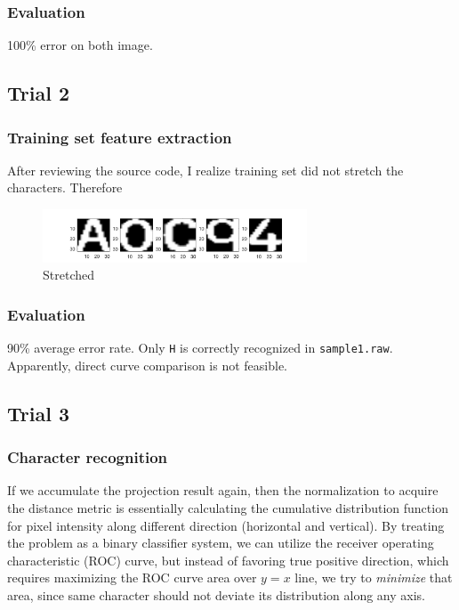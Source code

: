 \documentclass[12pt]{article}
\begin{document}
\subsubsection*{Evaluation}
100\% error on both image.

\subsection*{Trial 2}
\subsubsection*{Training set feature extraction}
After reviewing the source code, I realize training set did not stretch the characters. Therefore 
\begin{figure}[H]
    \centering
    \includegraphics[width=0.7\textwidth]{images/training_resized2_col1}
    \caption{Stretched}
\end{figure}

\subsubsection*{Evaluation}
90\% average error rate. Only {\tt H} is correctly recognized in {\tt sample1.raw}. Apparently, direct curve comparison is not feasible. 

\subsection*{Trial 3}
\subsubsection*{Character recognition}
If we accumulate the projection result again, then the normalization to acquire the distance metric is essentially calculating the cumulative distribution function for pixel intensity along different direction (horizontal and vertical). By treating the problem as a binary classifier system, we can utilize the receiver operating characteristic (ROC) curve, but instead of favoring true positive direction, which requires maximizing the ROC curve area over $y=x$ line, we try to {\it minimize} that area, since same character should not deviate its distribution along any axis.
\end{document}
